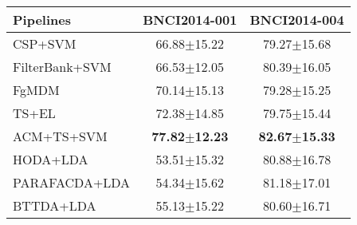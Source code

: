 \sffamily
\small
\begin{tabular}{@{}lcc@{}}
\toprule
     Pipelines &             BNCI2014-001 &             BNCI2014-004 \\
\midrule
       CSP+SVM &          66.88$\pm$15.22 &          79.27$\pm$15.68 \\
FilterBank+SVM &          66.53$\pm$12.05 &          80.39$\pm$16.05 \\
         FgMDM &          70.14$\pm$15.13 &          79.28$\pm$15.25 \\
         TS+EL &          72.38$\pm$14.85 &          79.75$\pm$15.44 \\
    ACM+TS+SVM & \textbf{77.82\boldmath$\pm$12.23} &  \textbf{82.67\boldmath$\pm$15.33} \\\midrule
      HODA+LDA &          53.51$\pm$15.32 &          80.88$\pm$16.78 \\
 PARAFACDA+LDA &          54.34$\pm$15.62 &          81.18$\pm$17.01 \\
     BTTDA+LDA &          55.13$\pm$15.22 &          80.60$\pm$16.71 \\
\bottomrule
\end{tabular}

